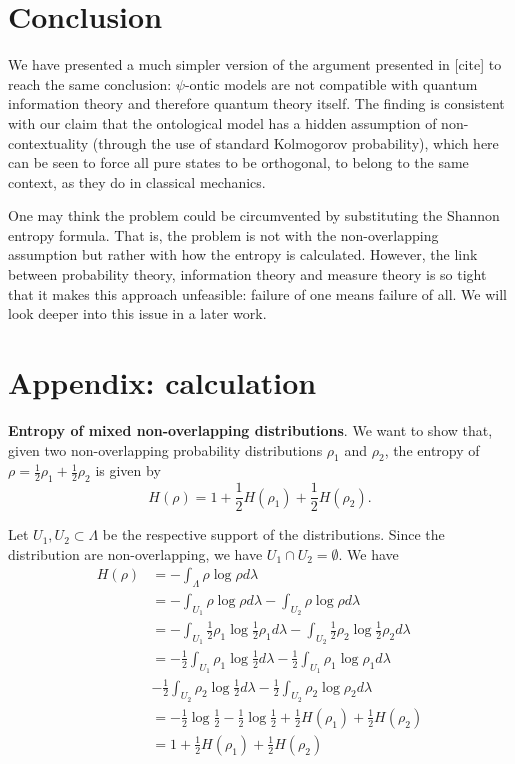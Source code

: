\documentclass[10pt,twocolumn, nofootinbib]{revtex4-2}
\begin{document}
\section{Conclusion}

We have presented a much simpler version of the argument presented in [cite] to reach the same conclusion: $\psi$-ontic models are not compatible with quantum information theory and therefore quantum theory itself. The finding is consistent with our claim that the ontological model has a hidden assumption of non-contextuality (through the use of standard Kolmogorov probability), which here can be seen to force all pure states to be orthogonal, to belong to the same context, as they do in classical mechanics.

One may think the problem could be circumvented by substituting the Shannon entropy formula. That is, the problem is not with the non-overlapping assumption but rather with how the entropy is calculated. However, the link between probability theory, information theory and measure theory is so tight that it makes this approach unfeasible: failure of one means failure of all. We will look deeper into this issue in a later work.

\section*{Appendix: calculation}

\textbf{Entropy of mixed non-overlapping distributions}. We want to show that, given two non-overlapping probability distributions $\rho_1$ and $\rho_2$, the entropy of $\rho = \frac{1}{2} \rho_1 + \frac{1}{2} \rho_2$ is given by
\begin{equation}\label{entropy_nonoverlap_appendix}
	H(\rho) = 1 + \frac{1}{2} H(\rho_1) + \frac{1}{2} H(\rho_2).
\end{equation}

Let $U_1, U_2 \subset \Lambda$ be the respective support of the distributions. Since the distribution are non-overlapping, we have $U_1 \cap U_2 = \emptyset$. We have
\begin{align*}
	H(\rho) &= - \int_\Lambda \rho \log \rho d\lambda \\
	&= -\int_{U_1} \rho \log \rho d\lambda -\int_{U_2} \rho \log \rho d\lambda \\
	&= -\int_{U_1} \frac{1}{2} \rho_1 \log \frac{1}{2} \rho_1 d\lambda -\int_{U_2} \frac{1}{2} \rho_2 \log \frac{1}{2} \rho_2 d\lambda \\
	&= - \frac{1}{2} \int_{U_1} \rho_1 \log \frac{1}{2} d\lambda - \frac{1}{2} \int_{U_1} \rho_1 \log \rho_1 d\lambda \\
	&- \frac{1}{2} \int_{U_2} \rho_2 \log \frac{1}{2} d\lambda - \frac{1}{2} \int_{U_2} \rho_2 \log \rho_2 d\lambda \\
	&= - \frac{1}{2} \log \frac{1}{2} - \frac{1}{2} \log \frac{1}{2} + \frac{1}{2} H(\rho_1) + \frac{1}{2} H(\rho_2) \\
	&= 1 + \frac{1}{2} H(\rho_1) + \frac{1}{2} H(\rho_2) \\
\end{align*}
\end{document}
